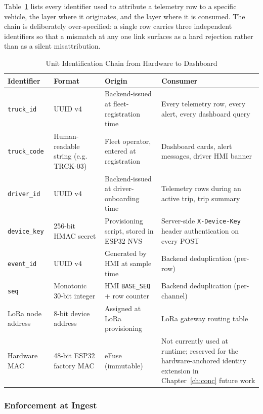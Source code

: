 Table~\ref{tab:unit_identification_chain} lists every identifier used to attribute a telemetry row to a specific vehicle, the layer where it originates, and the layer where it is consumed. The chain is deliberately over-specified: a single row carries three independent identifiers so that a mismatch at any one link surfaces as a hard rejection rather than as a silent misattribution.

\begin{table}[!htbp]
\centering
\caption{Unit Identification Chain from Hardware to Dashboard}
\label{tab:unit_identification_chain}
\small
\begin{tabular}{|p{}|p{}|p{}|p{}|}
\hline
\textbf{Identifier} & \textbf{Format} & \textbf{Origin} & \textbf{Consumer} \\
\hline
\texttt{truck\_id} & UUID v4 & Backend-issued at fleet-registration time & Every telemetry row, every alert, every dashboard query \\
\hline
\texttt{truck\_code} & Human-readable string (e.g. TRCK-03) & Fleet operator, entered at registration & Dashboard cards, alert messages, driver HMI banner \\
\hline
\texttt{driver\_id} & UUID v4 & Backend-issued at driver-onboarding time & Telemetry rows during an active trip, trip summary \\
\hline
\texttt{device\_key} & 256-bit HMAC secret & Provisioning script, stored in ESP32 NVS & Server-side \texttt{X-Device-Key} header authentication on every POST \\
\hline
\texttt{event\_id} & UUID v4 & Generated by HMI at sample time & Backend deduplication (per-row) \\
\hline
\texttt{seq} & Monotonic 30-bit integer & HMI \texttt{BASE\_SEQ} + row counter & Backend deduplication (per-channel) \\
\hline
LoRa node address & 8-bit device address & Assigned at LoRa provisioning & LoRa gateway routing table \\
\hline
Hardware MAC & 48-bit ESP32 factory MAC & eFuse (immutable) & Not currently used at runtime; reserved for the hardware-anchored identity extension in Chapter~\ref{ch:conc} future work \\
\hline
\end{tabular}
\end{table}

\FloatBarrier
\subsubsection{Enforcement at Ingest}
\label{sec:unit_id_ingest}

